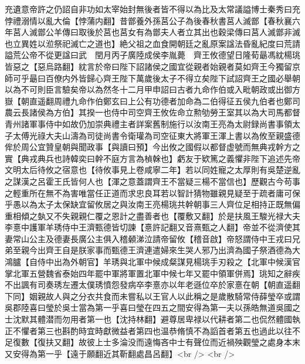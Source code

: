 充遺意帝許之仍詔自非功如太宰始封無後者皆不得以為比及太常議謚博士秦秀曰充悖禮溺情以亂大倫【悖蒲内翻】昔鄫養外孫莒公子為後春秋書莒人滅鄫【春秋襄六年莒人滅鄫公羊傳曰取後於莒也莒女有為鄫夫人者立其出也穀梁傳曰莒人滅鄫非滅也立異姓以涖祭祀滅亡之道也】絶父祖之血食開朝廷之亂原案諡法昏亂紀度曰荒請謚荒公帝不從更諡曰武　閏月丙子廣陸成侯李胤薨　齊王攸德望日隆荀朂馮紞楊珧皆惡之【惡烏路翻】紞言於帝曰陛下詔諸侯之國宜從親者始親者莫如齊王今獨留京師可乎朂曰百僚内外皆歸心齊王陛下萬歲後太子不得立矣陛下試詔齊王之國必舉朝以為不可則臣言驗矣帝以為然冬十二月甲申詔曰古者九命作伯或入毗朝政或出御方嶽【朝直遥翻周禮九命作伯鄭玄曰上公有功德者加命為二伯得征五侯九伯者也鄭司農云長諸侯為方伯】其揆一也侍中司空齊王攸佐命立勲劬勞王室其以為大司馬都督青州諸軍事侍中如故仍加崇典禮主者詳案舊制施行以汝南王亮為太尉録尚書事領太子太傅光祿大夫山濤為司徒尚書令衛瓘為司空征東大將軍王渾上書以為攸至親盛德侔於周公宜贊皇朝與聞政事【與讀曰預】今出攸之國假以都督虚號而無典戎幹方之實【典戎典兵也詩韓奕曰幹不庭方言為楨榦也】虧友于欵篤之義懼非陛下追述先帝文明太后待攸之宿意也【待攸事見上卷咸寧二年】若以同姓寵之太厚則有吳楚逆亂之謀漢之呂霍王氏皆何人也【渾之意蓋謂齊王不當疑三楊不當信也】歷觀古今苟事之輕重所在無不為害唯當任正道而求忠良耳若以智計猜物雖親見疑至于疏者庸可保乎愚以為太子太保缺宜留攸居之與汝南王亮楊珧共幹朝事三人齊位足相持正既無偏重相傾之埶又不失親親仁覆之恩計之盡善者也【覆敷又翻】於是扶風王駿光禄大夫李憙中護軍羊琇侍中王濟甄德皆切諫【憙許記翻又音熹甄之人翻】帝並不從濟使其妻常山公主及德妻長廣公主俱入稽顙涕泣請帝留攸【稽音啟】帝怒謂侍中王戎曰兄弟至親今出齊王自是朕家事而甄德王濟連遣婦來生哭人邪乃出濟為國子祭酒德為大鴻臚【自侍中出為外朝官】羊琇與北軍中候成粲謀見楊珧手刃殺之【北軍中候漢官掌北軍五營魏省泰始四年罷中軍將軍置北軍中候七年又罷中領軍併焉】珧知之辭疾不出諷有司奏琇左遷太僕琇憤怨發病卒李憙亦以年老遜位卒於家憙在朝【朝直遥翻下同】姻親故人與之分衣共食而未嘗私以王官人以此稱之是歲散騎常侍薛瑩卒或謂吳郡陸喜曰瑩於吳士當為第一乎喜曰瑩在四五之間安得為第一夫以孫皓無道吳國之士沈默其體潜而勿用者第一也【沈持林翻】避尊居卑禄以代耕者第二也侃然體國執正不懼者第三也斟酌時宜時獻微益者第四也温恭脩慎不為謟首者第五也過此以往不足復數【復扶又翻】故彼上士多淪没而遠悔吝中士有聲位而近禍殃觀瑩之處身本末又安得為第一乎【遠于願翻近其靳翻處昌呂翻】<br />
<br />
